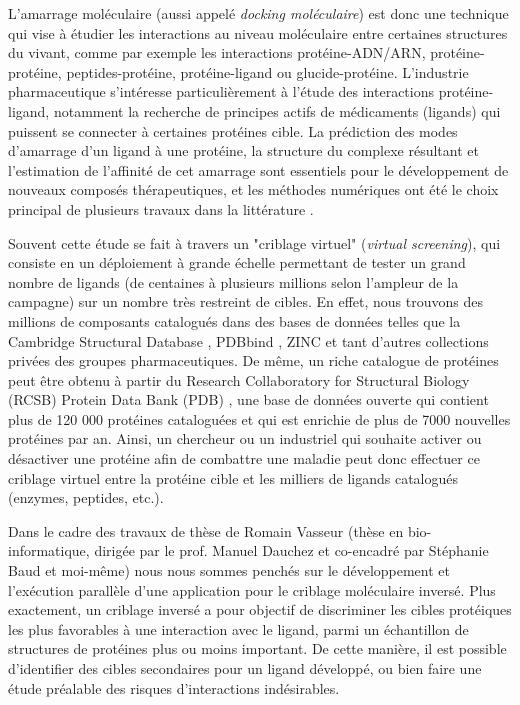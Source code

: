 L'amarrage moléculaire (aussi appelé \emph{docking moléculaire}) est donc une technique qui vise à étudier les interactions au niveau moléculaire entre certaines structures du vivant, comme par exemple les interactions protéine-ADN/ARN, protéine-protéine, peptides-protéine, protéine-ligand ou glucide-protéine. L'industrie pharmaceutique s'intéresse particulièrement à l'étude des interactions protéine-ligand, notamment la recherche de principes actifs de médicaments (ligands) qui puissent se connecter à certaines protéines cible. La prédiction des modes d'amarrage d'un ligand à une protéine, la structure du complexe résultant et l'estimation de l'affinité de cet amarrage sont essentiels pour le développement de nouveaux composés thérapeutiques, et les méthodes numériques ont été le choix principal de plusieurs travaux dans la littérature \cite{Abagyan2001,Giganti2010, Klebe2006}.

 Souvent cette étude se fait à travers un "criblage virtuel" (\emph{virtual screening}), qui consiste en un déploiement à grande échelle permettant de tester un grand nombre de ligands (de centaines à plusieurs millions selon l'ampleur de la campagne) sur un nombre très restreint de cibles. En effet, nous trouvons des millions de composants catalogués dans des bases de données telles que la Cambridge Structural Database \cite{Allen2002}, PDBbind  \cite{Wang2004, Wang2005}, ZINC \cite{Irwin2005} et tant d'autres collections privées des groupes pharmaceutiques. De même, un riche catalogue de protéines peut être obtenu à partir du Research Collaboratory for Structural Biology (RCSB) Protein Data Bank (PDB) \cite{PDB}, une base de données ouverte qui contient plus de 120 000 protéines cataloguées et qui est enrichie de plus de 7000 nouvelles protéines par an. Ainsi, un chercheur ou un industriel qui souhaite activer ou désactiver une protéine afin de combattre une maladie peut donc effectuer ce criblage virtuel entre la protéine cible et les milliers de ligands catalogués (enzymes, peptides, etc.).  

Dans le cadre des travaux de thèse de Romain Vasseur (thèse en bio-informatique, dirigée par le prof. Manuel Dauchez et co-encadré par Stéphanie Baud et moi-même) nous nous sommes penchés sur le développement et l'exécution parallèle d'une application pour le criblage moléculaire inversé. Plus exactement, un criblage inversé a pour objectif de discriminer les cibles protéiques les plus favorables à une interaction avec le ligand, parmi un échantillon de structures de protéines plus ou moins important. De cette manière, il est possible d'identifier des cibles secondaires pour un ligand développé, ou bien faire une étude préalable des risques d'interactions indésirables. 

